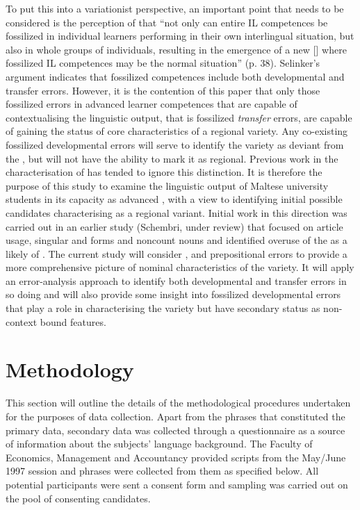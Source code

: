 \documentclass[output=paper]{langsci/langscibook}
\begin{document}
To put this into a variationist perspective, an important point that
needs to be considered is the perception of \citet{Selinker1974}
that “not only
can entire IL competences be fossilized in individual learners
performing in their own interlingual situation, but also in whole
groups of individuals, resulting in the emergence of a new  [\textellipsis]
where fossilized IL competences may be the normal situation”
(p. 38). Selinker’s argument indicates that fossilized competences
include both developmental and transfer errors. However, it is the
contention of this paper that only those fossilized errors in advanced
learner competences that are capable of contextualising the linguistic
output, that is fossilized \textit{transfer} errors, are capable of
gaining the status of core characteristics of a regional variety. Any
co-existing fossilized developmental errors will serve to identify the
variety as deviant from the 
, but will not
have the ability to mark it as regional. Previous work in the
characterisation of  has tended to ignore this
distinction. It is therefore the purpose of this study to examine the
linguistic output of Maltese university students in its capacity as
advanced , with a view to identifying initial possible
candidates characterising  as a regional variant. Initial work in this
direction was carried out in an earlier study (Schembri, under review)
that focused on article usage, singular and  forms and noncount
nouns and identified overuse of the  as a likely
 of . The current study will consider
,  and prepositional errors to provide a more
comprehensive picture of nominal characteristics of the variety. It
will apply an error-analysis approach to identify both developmental
and transfer errors in so doing and will also provide some insight
into fossilized developmental errors that play a role in
characterising the variety but have secondary status as non-context
bound features.


\section{Methodology}
\label{sec:key:3}
This section will outline the details of the methodological procedures
undertaken for the purposes of data collection. Apart from the 
phrases that constituted the primary data, secondary data was
collected through a questionnaire as a source of information about the
subjects’ language background. The Faculty of Economics, Management
and Accountancy provided scripts from the May/June 1997 session and
 phrases were collected from them as specified below. All
potential participants were sent a consent form and sampling was
carried out on the pool of consenting candidates.
\end{document}
